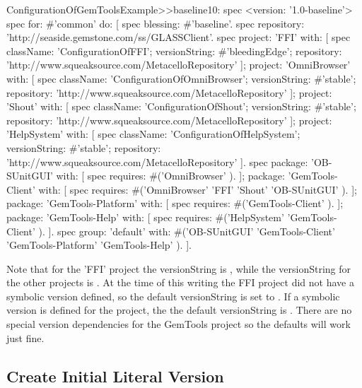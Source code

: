 \documentclass[a4paper,10pt,twoside]{book}
\begin{document}
\begin{code}{}
\begin{code}{}
\begin{code}{}
ConfigurationOfGemToolsExample>>baseline10: spec
  <version: '1.0-baseline'>
  spec for: #'common' do: [
     spec blessing: #'baseline'.
     spec repository: 'http://seaside.gemstone.com/ss/GLASSClient'.
     spec
        project: 'FFI' with: [
          spec
             className: 'ConfigurationOfFFI';
             versionString: #'bleedingEdge';
             repository: 'http://www.squeaksource.com/MetacelloRepository' ];
        project: 'OmniBrowser' with: [
          spec
             className: 'ConfigurationOfOmniBrowser';
             versionString: #'stable';
             repository: 'http://www.squeaksource.com/MetacelloRepository' ];
        project: 'Shout' with: [
          spec
             className: 'ConfigurationOfShout';
             versionString: #'stable';
             repository: 'http://www.squeaksource.com/MetacelloRepository' ];
        project: 'HelpSystem' with: [
          spec
             className: 'ConfigurationOfHelpSystem';
             versionString: #'stable';
             repository: 'http://www.squeaksource.com/MetacelloRepository' ].
     spec
        package: 'OB-SUnitGUI' with: [
          spec requires: #('OmniBrowser' ). ];
        package: 'GemTools-Client' with: [
          spec requires: #('OmniBrowser' 'FFI' 'Shout' 'OB-SUnitGUI' ). ];
        package: 'GemTools-Platform' with: [
          spec requires: #('GemTools-Client' ). ];
        package: 'GemTools-Help' with: [
          spec requires: #('HelpSystem' 'GemTools-Client' ). ].
     spec group: 'default' with: #('OB-SUnitGUI' 'GemTools-Client'
             'GemTools-Platform' 'GemTools-Help' ). ].
\end{code}             



Note that for the 'FFI' project the versionString is , while the versionString for the other projects is . At the time of this writing the FFI project did not have a  symbolic version defined, so the default versionString is set to . If a  symbolic version is defined for the project, the the default versionString is . There are no special version dependencies for the GemTools project so the defaults will work just fine.



\subsection{Create Initial Literal Version}


\end{code}
\end{code}
\end{document}
